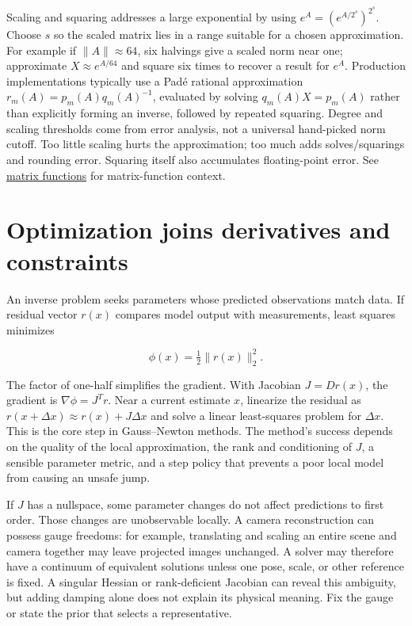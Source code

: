 Scaling and squaring addresses a large exponential by using \(e^A=(e^{A/2^s})^{2^s}\). Choose \(s\) so the scaled matrix lies in a range suitable for a chosen approximation. For example if \(\|A\|\approx64\), six halvings give a scaled norm near one; approximate \(X\approx e^{A/64}\) and square six times to recover a result for \(e^A\). Production implementations typically use a Padé rational approximation \(r_m(A)=p_m(A)q_m(A)^{-1}\), evaluated by solving \(q_m(A)X=p_m(A)\) rather than explicitly forming an inverse, followed by repeated squaring. Degree and scaling thresholds come from error analysis, not a universal hand-picked norm cutoff. Too little scaling hurts the approximation; too much adds solves/squarings and rounding error. Squaring itself also accumulates floating-point error. See \hyperref[02-foundations-ii-ch026-matrix-functions-turn-repeated-linear-actions-into-one-operator]{matrix functions} for matrix-function context.

\section{Optimization joins derivatives and constraints}\label{02-foundations-ii-ch026-optimization-joins-derivatives-and-constraints}

\hypertarget{02-foundations-ii-ch026-optimization-joins-derivatives-and-constraints}{}

An inverse problem seeks parameters whose predicted observations match data. If residual vector \(r(x)\) compares model output with measurements, least squares minimizes

\[
\phi(x)=\tfrac12\|r(x)\|_2^2.
\]

The factor of one-half simplifies the gradient. With Jacobian \(J=Dr(x)\), the gradient is \(\nabla\phi=J^Tr\). Near a current estimate \(x\), linearize the residual as \(r(x+\Delta x)\approx r(x)+J\Delta x\) and solve a linear least-squares problem for \(\Delta x\). This is the core step in Gauss--Newton methods. The method's success depends on the quality of the local approximation, the rank and conditioning of \(J\), a sensible parameter metric, and a step policy that prevents a poor local model from causing an unsafe jump.

If \(J\) has a nullspace, some parameter changes do not affect predictions to first order. Those changes are unobservable locally. A camera reconstruction can possess gauge freedoms: for example, translating and scaling an entire scene and camera together may leave projected images unchanged. A solver may therefore have a continuum of equivalent solutions unless one pose, scale, or other reference is fixed. A singular Hessian or rank-deficient Jacobian can reveal this ambiguity, but adding damping alone does not explain its physical meaning. Fix the gauge or state the prior that selects a representative.

